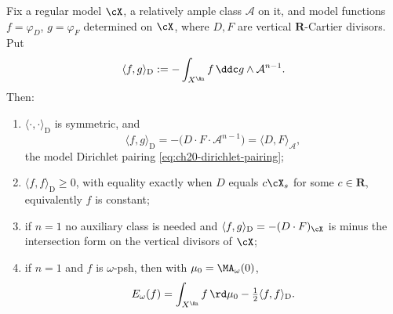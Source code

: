 \begin{proposition}
\label{prop:ch26-dirichlet-vertical}
Fix a regular model $\cX$, a relatively ample class $\mathcal A$ on it,
and model functions $f=\varphi_D$, $g=\varphi_F$ determined on $\cX$,
where $D,F$ are vertical $\mathbf R$-Cartier divisors.  Put
\begin{equation}
\label{eq:ch26-dirichlet-form}
 \langle f,g\rangle_{\mathrm D}
 :=-\int_{X^{\An}}f\,\ddc g\wedge\mathcal A^{n-1}.
\end{equation}
Then:
\begin{enumerate}
\item\label{itm:ch26-dir:sym}
 $\langle\cdot,\cdot\rangle_{\mathrm D}$ is symmetric, and
 \[
  \langle f,g\rangle_{\mathrm D}
  =-\bigl(D\cdot F\cdot\mathcal A^{n-1}\bigr)
  =\langle D,F\rangle_{\mathcal A},
 \]
 the model Dirichlet pairing \eqref{eq:ch20-dirichlet-pairing};
\item\label{itm:ch26-dir:pos}
 $\langle f,f\rangle_{\mathrm D}\geq0$, with equality exactly when $D$
 equals $c\cX_s$ for some $c\in\mathbf R$, equivalently $f$ is constant;
\item\label{itm:ch26-dir:curve}
 if $n=1$ no auxiliary class is needed and
 $\langle f,g\rangle_{\mathrm D}=-(D\cdot F)_{\cX}$ is minus the
 intersection form on the vertical divisors of $\cX$;
\item\label{itm:ch26-dir:energy}
 if $n=1$ and $f$ is $\omega$-psh, then with
 $\mu_0=\MA_\omega(0)$,
 \begin{equation}
 \label{eq:ch26-energy-dirichlet}
  E_\omega(f)=\int_{X^{\An}}f\,\rd\mu_0
              -\tfrac12\langle f,f\rangle_{\mathrm D}.
 \end{equation}
\end{enumerate}
\end{proposition}

